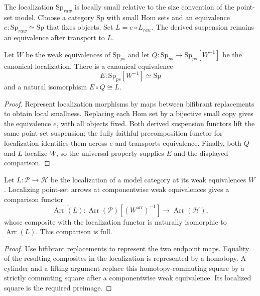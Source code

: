 \begin{theorem}
\label{sem:AdamsSynthetic:model-localization}
The localization $\mathrm{Sp}_{raw}$ is locally small relative to the
size convention of the point-set model. Choose a category $\mathrm{Sp}$
with small Hom sets and an equivalence
$e\colon\mathrm{Sp}_{raw}\simeq\mathrm{Sp}$ that fixes objects. Set $L=e\circ L_{raw}$. The derived suspension remains an equivalence after transport to $L$.

Let $W$ be the weak equivalences of $\mathrm{Sp}_{ps}$ and let
$Q\colon\mathrm{Sp}_{ps}\to\mathrm{Sp}_{ps}[W^{-1}]$ be the canonical
localization. There is a canonical equivalence
\[
 E\colon\mathrm{Sp}_{ps}[W^{-1}]\simeq\mathrm{Sp}
\]
and a natural isomorphism $E\circ Q\cong L$.
\end{theorem}
\begin{proof}
Represent localization morphisms by maps between bifibrant replacements
to obtain local smallness. Replacing each Hom set by a bijective small
copy gives the equivalence $e$, with all objects fixed. Both derived suspension functors lift the same
point-set suspension; the fully faithful precomposition functor for
localization identifies them across $e$ and transports equivalence.
Finally, both $Q$ and $L$ localize $W$, so the universal property supplies
$E$ and the displayed comparison.
\end{proof}


\begin{theorem}
\label{sem:AdamsSynthetic:derived-arrow-full}
Let $L\colon\mathcal P\to\mathcal H$ be the localization of a model
category at its weak equivalences $W$. Localizing point-set arrows at
componentwise weak equivalences gives a comparison functor
\[
 \overline{\operatorname{Arr}(L)}\colon
 \operatorname{Arr}(\mathcal P)[(W^{\mathrm{arr}})^{-1}]
 \longrightarrow\operatorname{Arr}(\mathcal H),
\]
whose composite with the localization functor is naturally isomorphic
to $\operatorname{Arr}(L)$. This comparison is full.
\end{theorem}
\begin{proof}
Use bifibrant replacements to represent the two endpoint maps. Equality
of the resulting composites in the localization is represented by a
homotopy. A cylinder and a lifting argument replace this homotopy-commuting
square by a strictly commuting square after a componentwise weak
equivalence. Its localized square is the required preimage.
\end{proof}

